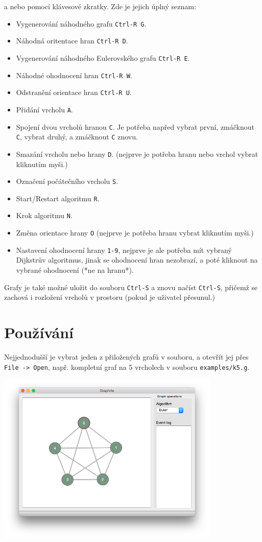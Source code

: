 \documentclass{article}
\def\code#1{\texttt{#1}}
\begin{document}
a nebo pomocí klávesové zkratky. Zde je jejich úplný seznam:

\begin{itemize}
  \item Vygenerování náhodného grafu \code{Ctrl-R G}.
  \item Náhodná oritentace hran \code{Ctrl-R D}.
  \item Vygenerování náhodného Eulerovského grafu \code{Ctrl-R E}.
  \item Náhodné ohodnocení hran \code{Ctrl-R W}.
  \item Odstranění orientace hran \code{Ctrl-R U}.
  \item Přidání vrcholu \code{A}.
  \item Spojení dvou vrcholů hranou \code{C}. Je potřeba napřed vybrat první, zmáčknout \code{C}, vybrat druhý, a zmáčknout \code{C} znovu.
  \item Smazání vrcholu nebo hrany \code{D}. (nejprve je potřeba hranu nebo vrchol vybrat kliknutím myši.)
  \item Označení počátečního vrcholu \code{S}.
  \item Start/Restart algoritmu \code{R}.
  \item Krok algoritmu \code{N}.
  \item Změna orientace hrany \code{O} (nejprve je potřeba hranu vybrat kliknutím myši.)
  \item Nastavení ohodnocení hrany \code{1-9}, nejprve je ale potřeba mít vybraný Dijkstrův algoritmus, jinak se ohodnocení hran nezobrazí, a poté kliknout na vybrané ohodnocení (*ne na hranu*).
\end{itemize}

Grafy je také možné uložit do souboru \code{Ctrl-S} a znovu načíst \code{Ctrl-S},
přičemž se zachová i rozložení vrcholů v prostoru (pokud je uživatel
přesunul.)

\section{Používání}

Nejjednodušší je vybrat jeden z přiložených grafů v souboru, a otevřít
jej přes \code{File -> Open}, např. kompletní graf na 5 vrcholech v souboru
\code{examples/k5.g}.

\begin{center}
	\includegraphics[width=0.8\textwidth]{iYrD1VK.png}	
\end{center}
\end{document}
